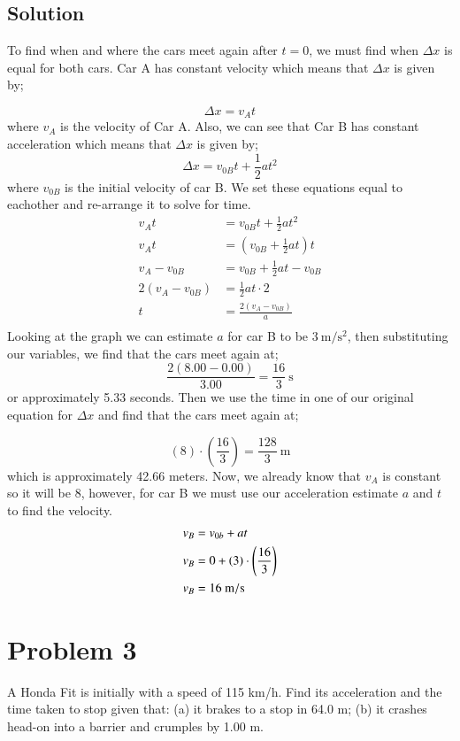 \documentclass{article}
\begin{document}
\subsection*{Solution}
To find when and where the cars meet again after $t = 0$, we must find when $\Delta x$ is equal for both cars. Car A has constant velocity which means that $\Delta x$ is given by;

\[
	\Delta x = v_A t
\]
where $v_A$ is the velocity of Car A. Also, we can see that Car B has constant acceleration which means that $\Delta x$ is given by;
\[
	\Delta x = v_{0B} t + \frac{1}{2} a t^2
\]
where $v_{0B}$ is the initial velocity of car B. We set these equations equal to eachother and re-arrange it to solve for time.
\begin{align*}
	v_A t &= v_{0B} t + \frac{1}{2} a t^2 \\
	v_A t &= \left( v_{0B} + \frac{1}{2} a t \right) t \\
	v_A - v_{0B} &= v_{0B} + \frac{1}{2} a t  - v_{0B} \\
	2 \left( v_A - v_{0B} \right) &= \frac{1}{2} a t \cdot 2 \\
	t &= \frac{2 \left( v_A - v_{0B} \right)}{a} \\
\end{align*}
Looking at the graph we can estimate $a$ for car B to be $3\ \unit{\meter\per\second^2}$, then substituting our variables, we find that the cars meet again at;
\[
	\frac{2 \left( 8.00 - 0.00 \right)}{3.00} = \frac{16}{3}\ \unit{\second}
\]
or approximately 5.33 seconds. Then we use the time in one of our original equation for $\Delta x$ and find that the cars meet again at;

\[
	\left( 8 \right) \cdot \left(\frac{16}{3}\right) = \frac{128}{3}\ \unit{\meter}
\]
which is approximately 42.66 meters. Now, we already know that $v_A$ is constant so it will be 8, however, for car B we must use our acceleration estimate $a$ and $t$ to find the velocity.
\begin{align*}
	v_B &= v_{0b} + at \\
	v_B &= 0 + \left( 3 \right) \cdot \left( \frac{16}{3} \right) \\
	v_B &= 16\ \unit{{\meter\per\second}}
\end{align*}

\section*{Problem 3}
A Honda Fit is initially with a speed of 115 km/h. Find its acceleration and the time taken
to stop given that: (a) it brakes to a stop in 64.0 m; (b) it crashes head-on into a barrier and
crumples by 1.00 m.
\end{document}
